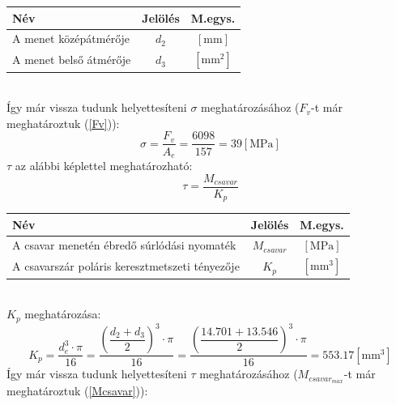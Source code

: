 \documentclass[10pt, a4paper]{article}
\newcommand{\mpa}{\mathrm{\left[MPa\right]}}
\newcommand{\mm}{\mathrm{\left[mm\right]}}
\newcommand{\mmn}{\mathrm{\left[mm^2\right]}}
\newcommand{\mmh}{\mathrm{\left[mm^3\right]}}
\begin{document}
				\vspace{-20pt}
					\renewcommand{\arraystretch}{1.4}
										\begin{table}[!h]
											\centering
											\begin{tabular}{l|c|c}
												\textbf{Név}                              & \textbf{Jelölés} & \textbf{M.egys.} \\ \hline
												A menet középátmérője                      & $d_2$                & $\mm$          \\
												A menet belső átmérője          & $d_3$                & $\mmn$			 	 	       
											\end{tabular}
										\end{table}
					\renewcommand{\arraystretch}{1}\\
	Így már vissza tudunk helyettesíteni $\sigma$ meghatározásához ($F_v$-t már meghatároztuk (\ref{Fv})):
	\begin{equation}
			\sigma = \dfrac{F_v}{A_e} = \dfrac{6098}{157} = 39 \mpa\tag{6.1}
	\end{equation}
	$\tau$ az alábbi képlettel meghatározható:
	\begin{equation}
		\tau = \dfrac{M_{csavar}}{K_p} \tag{6.2}
	\end{equation}
					\vspace{-20pt}
						\renewcommand{\arraystretch}{1.4}
											\begin{table}[!h]
												\centering
												\begin{tabular}{l|c|c}
													\textbf{Név}                              & \textbf{Jelölés} & \textbf{M.egys.} \\ \hline
													A csavar menetén ébredő súrlódási nyomaték                      & $M_{csavar}$                & $\mpa$          \\
													A csavarszár poláris keresztmetszeti tényezője          & $K_p$                & $\mmh$			 	 	       
												\end{tabular}
											\end{table}
						\renewcommand{\arraystretch}{1}\\
	$K_p$ meghatározása:
	\begin{equation}
			K_p = \dfrac{d_e^3 \cdot \pi}{16} = \dfrac{\left(\dfrac{d_2 + d_3}{2}\right)^3 \cdot \pi}{16} = \dfrac{\left(\dfrac{14.701 + 13.546}{2}\right)^3 \cdot \pi}{16} = 553.17 \mmh\tag{6.2.1}
	\end{equation}
	Így már vissza tudunk helyettesíteni $\tau$ meghatározásához ($M_{csavar_{max}}$-t már meghatároztuk (\ref{Mcsavar})):
\end{document}
